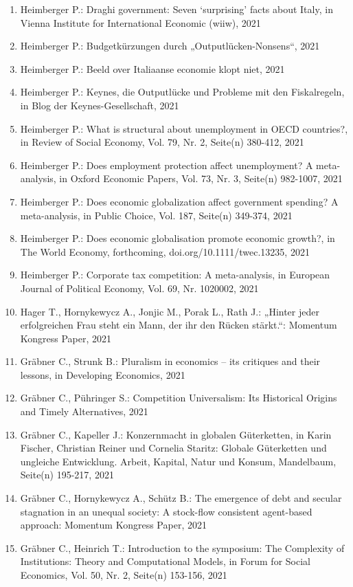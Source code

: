 \begin{enumerate}
	 \item Heimberger P.: Draghi government: Seven ‘surprising’ facts about Italy, in Vienna Institute for International Economic (wiiw), 2021
	 \item Heimberger P.: Budgetkürzungen durch „Outputlücken-Nonsens“, 2021
	 \item Heimberger P.: Beeld over Italiaanse economie klopt niet, 2021
	 \item Heimberger P.: Keynes, die Outputlücke und Probleme mit den Fiskalregeln, in Blog der Keynes-Gesellschaft, 2021
	 \item Heimberger P.: What is structural about unemployment in OECD countries?, in Review of Social Economy, Vol. 79, Nr. 2, Seite(n) 380-412, 2021
	 \item Heimberger P.: Does employment protection affect unemployment? A meta-analysis, in Oxford Economic Papers, Vol. 73, Nr. 3, Seite(n) 982-1007, 2021
	 \item Heimberger P.: Does economic globalization affect government spending? A meta-analysis, in Public Choice, Vol. 187, Seite(n) 349-374, 2021
	 \item Heimberger P.: Does economic globalisation promote economic growth?, in The World Economy, forthcoming, doi.org/10.1111/twec.13235, 2021
	 \item Heimberger P.: Corporate tax competition: A meta-analysis, in European Journal of Political Economy, Vol. 69, Nr. 1020002, 2021
	 \item Hager T., Hornykewycz A., Jonjic M., Porak L., Rath J.: „Hinter jeder erfolgreichen Frau steht ein Mann, der ihr den Rücken stärkt.“: Momentum Kongress Paper, 2021
	 \item Gräbner C., Strunk B.: Pluralism in economics – its critiques and their lessons, in Developing Economics, 2021
	 \item Gräbner C., Pühringer S.: Competition Universalism: Its Historical Origins and Timely Alternatives, 2021
	 \item Gräbner C., Kapeller J.: Konzernmacht in globalen Güterketten, in Karin Fischer, Christian Reiner und Cornelia Staritz: Globale Güterketten und ungleiche Entwicklung. Arbeit, Kapital, Natur und Konsum, Mandelbaum, Seite(n) 195-217, 2021
	 \item Gräbner C., Hornykewycz A., Schütz B.: The emergence of debt and secular stagnation in an unequal society: A stock-flow consistent agent-based approach: Momentum Kongress Paper, 2021
	 \item Gräbner C., Heinrich T.: Introduction to the symposium: The Complexity of Institutions: Theory and Computational Models, in Forum for Social Economics, Vol. 50, Nr. 2, Seite(n) 153-156, 2021

\end{enumerate}
